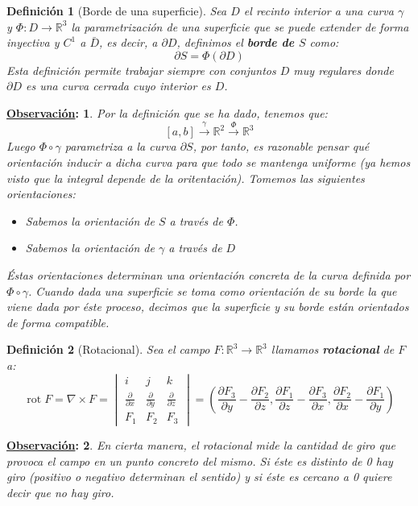 \documentclass[10pt,a4paper,openright]{book}
\theoremstyle{break}
\newtheorem*{defi}{Definición}
\newtheorem*{obs}{\underline{Observación}:}
\DeclareMathOperator{\rot}{rot}
\begin{document}
\begin{defi}[Borde de una superficie]
Sea $D$ el recinto interior a una curva $\gamma$ y $\Phi: D \rightarrow \mathbb{R}^3$ la parametrización de una superficie que se puede extender de forma inyectiva y $C^1$ a $\bar{D}$, es decir, a $\partial D$, definimos el \textbf{borde de $S$} como:
$$\partial S = \Phi\left( \partial D \right)$$
Esta definición permite trabajar siempre con conjuntos $D$ muy regulares donde $\partial D$ es una curva cerrada cuyo interior es $D$.
\end{defi}
\begin{obs}
Por la definición que se ha dado, tenemos que: 
$$\left[ a, b \right] \xrightarrow{\gamma} \mathbb{R}^2 \xrightarrow{\Phi} \mathbb{R}^3$$
Luego $\Phi \circ \gamma$ parametriza a la curva $\partial S$, por tanto, es razonable pensar qué orientación inducir a dicha curva para que todo se mantenga uniforme (ya hemos visto que la integral depende de la oritentación). Tomemos las siguientes orientaciones: 
    \begin{itemize}
        \item Sabemos la orientación de $S$ a través de $\Phi$. 
        \item Sabemos la orientación de $\gamma$ a través de $D$
    \end{itemize}
Éstas orientaciones determinan una orientación concreta de la curva definida por $\Phi \circ \gamma$. Cuando dada una superficie se toma como orientación de su borde la que viene dada por éste proceso, decimos que la superficie y su borde están orientados de forma compatible.
\end{obs}

\begin{defi}[Rotacional]
Sea el campo $F: \mathbb{R}^3 \rightarrow \mathbb{R}^3$ llamamos \textbf{rotacional} de $F$ a: 
$$\rot F = \nabla \times F = \begin{vmatrix} i & j & k\\
\frac{\partial}{\partial x} & \frac{\partial }{\partial y} & \frac{\partial }{\partial z} \\
F_1 & F_2 & F_3\end{vmatrix} = \left( \frac{\partial F_3}{\partial y} - \frac{\partial F_2}{\partial z}, \frac{\partial F_1}{\partial z} - \frac{\partial F_3}{\partial x}, \frac{\partial F_2}{\partial x} - \frac{\partial F_1}{\partial y} \right)$$
\end{defi}

\begin{obs}
En cierta manera, el rotacional mide la cantidad de giro que provoca el campo en un punto concreto del mismo. Si éste es distinto de 0 hay giro (positivo o negativo determinan el sentido) y si éste es cercano a 0 quiere decir que no hay giro.
\end{obs}
\end{document}
